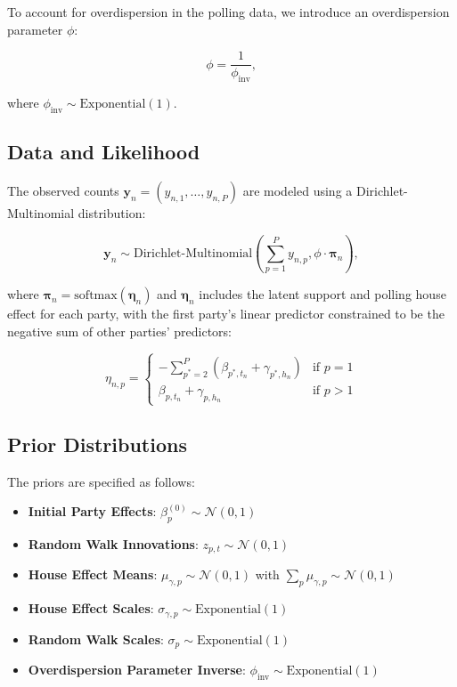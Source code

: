 \documentclass[
  letterpaper,
  DIV=11,
  numbers=noendperiod,
  oneside]{scrartcl}
\providecommand{\tightlist}{%
  \setlength{\itemsep}{0pt}\setlength{\parskip}{0pt}}\usepackage{longtable,booktabs,array}
\begin{document}
To account for overdispersion in the polling data, we introduce an
overdispersion parameter \(\phi\):

\[
\phi = \frac{1}{\phi_{\text{inv}}},
\]

where \(\phi_{\text{inv}} \sim \text{Exponential}(1)\).

\subsection{Data and Likelihood}\label{data-and-likelihood}

The observed counts
\(\mathbf{y}_{n} = \left(y_{n,1}, \dots, y_{n,P}\right)\) are modeled
using a Dirichlet-Multinomial distribution:

\[
\mathbf{y}_{n} \sim \text{Dirichlet-Multinomial}\left(\sum_{p=1}^P y_{n,p}, \phi \cdot \boldsymbol{\pi}_{n}\right),
\]

where
\(\boldsymbol{\pi}_{n} = \text{softmax}\left(\boldsymbol{\eta}_{n}\right)\)
and \(\boldsymbol{\eta}_{n}\) includes the latent support and polling
house effect for each party, with the first party's linear predictor
constrained to be the negative sum of other parties' predictors:

\[
\eta_{n,p} = \begin{cases}
-\sum_{p^*=2}^{P} (\beta_{p^*,t_n} + \gamma_{p^*,h_n}) & \text{if } p = 1 \\
\beta_{p,t_n} + \gamma_{p,h_n} & \text{if } p > 1
\end{cases}
\]

\subsection{Prior Distributions}\label{prior-distributions}

The priors are specified as follows:

\begin{itemize}
\tightlist
\item
  \textbf{Initial Party Effects}:
  \(\beta_{p}^{(0)} \sim \mathcal{N}(0, 1)\)
\item
  \textbf{Random Walk Innovations}: \(z_{p,t} \sim \mathcal{N}(0, 1)\)
\item
  \textbf{House Effect Means}: \(\mu_{\gamma,p} \sim \mathcal{N}(0, 1)\)
  with \(\sum_p \mu_{\gamma,p} \sim \mathcal{N}(0, 1)\)
\item
  \textbf{House Effect Scales}:
  \(\sigma_{\gamma,p} \sim \text{Exponential}(1)\)
\item
  \textbf{Random Walk Scales}: \(\sigma_p \sim \text{Exponential}(1)\)
\item
  \textbf{Overdispersion Parameter Inverse}:
  \(\phi_{\text{inv}} \sim \text{Exponential}(1)\)
\end{itemize}
\end{document}

